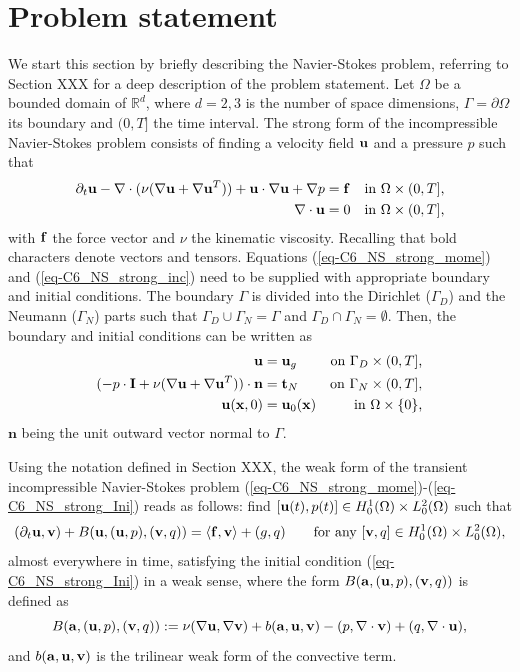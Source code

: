 \section{Problem statement}
\label{sec-C6_prob_statement}
We start this section by briefly describing the Navier-Stokes problem, referring to Section XXX for a deep description of the problem statement.
Let $\Omega$ be a bounded domain of $\mathbb{R}^d$, where $d=2,3$ is the number of space dimensions, $\Gamma=\partial\Omega$ its boundary and $(0,T]$ the time interval. The strong form of the incompressible Navier-Stokes problem consists of finding a velocity field ${\bf u}$ and a pressure $p$ such that 
\begin{align}
\label{eq-C6_NS_strong_mome}
\partial_t{\bf u}-\nabla\cdot(\nu(\nabla{\bf u}+\nabla{\bf u}^T))+{\bf u}\cdot\nabla{\bf u}+\nabla p&={\bf f}&\mbox{in $\Omega\times(0,T]$,}\\
\label{eq-C6_NS_strong_inc}
\nabla\cdot{\bf u}&=0&\mbox{in $\Omega\times(0,T]$,}
\end{align}
with ${\bf f}$ the force vector and $\nu$ the kinematic viscosity. Recalling that bold characters denote vectors and tensors. Equations (\ref{eq-C6_NS_strong_mome}) and (\ref{eq-C6_NS_strong_inc}) need to be supplied with appropriate boundary and initial conditions. The boundary $\Gamma$ is divided into the Dirichlet ($\Gamma_D$) and the Neumann ($\Gamma_N$) parts such that $\Gamma_D\cup\Gamma_N=\Gamma$ and $\Gamma_D\cap\Gamma_N=\emptyset$. Then, the boundary and initial conditions can be written as
\begin{align}
\label{eq-C6_NS_strong_Dir}
{\bf u}&={\bf u}_g&\mbox{on $\Gamma_D\times(0,T]$,}\\
\label{eq-C6_NS_strong_Neu}
(-p\cdot\mathbf{I}+\nu(\nabla{\bf u}+\nabla{\bf u}^T))\cdot\mathbf{n}&=\mathbf{t}_N&\mbox{on $\Gamma_N\times(0,T]$,}\\
\label{eq-C6_NS_strong_Ini}
{\bf u}({\bf x},0)&={\bf u}_0({\bf x})&\mbox{in $\Omega\times\{0\}$,}
\end{align}
$\mathbf{n}$ being the unit outward vector normal to $\Gamma$. 

Using the notation defined in Section XXX, the weak form of the transient incompressible Navier-Stokes problem (\ref{eq-C6_NS_strong_mome})-(\ref{eq-C6_NS_strong_Ini}) reads as follows: find $[{\bf u}(t),p(t)]\in H_0^1(\Omega) \times L^2_0(\Omega)$ such that
\begin{equation}
\label{eq-C6_NS_weak}
(\partial_t{\bf u},{\bf v}) + B({\bf u},({\bf u},p),({\bf v},q)) = \left<{\bf f},{\bf v}\right> + (g,q)
\quad\quad \hbox{for any}  \ [{\bf v},q ] \in H_0^1(\Omega) \times L^2_0(\Omega),
\end{equation}
almost everywhere in time, satisfying the initial condition (\ref{eq-C6_NS_strong_Ini}) in a weak sense, where the form $B({\bf a},({\bf u},p),({\bf v},q))$ is defined as 
\begin{equation}
\label{eq-C6_bilinear}
B({\bf a},({\bf u},p),({\bf v},q)):=\nu(\nabla{\bf u},\nabla{\bf v})+b({\bf a},{\bf u},{\bf v})-(p,\nabla\cdot{\bf v})+(q,\nabla\cdot{\bf u}),
\end{equation}
and $b({\bf a},{\bf u},{\bf v})$ is the trilinear weak form of the convective term.

